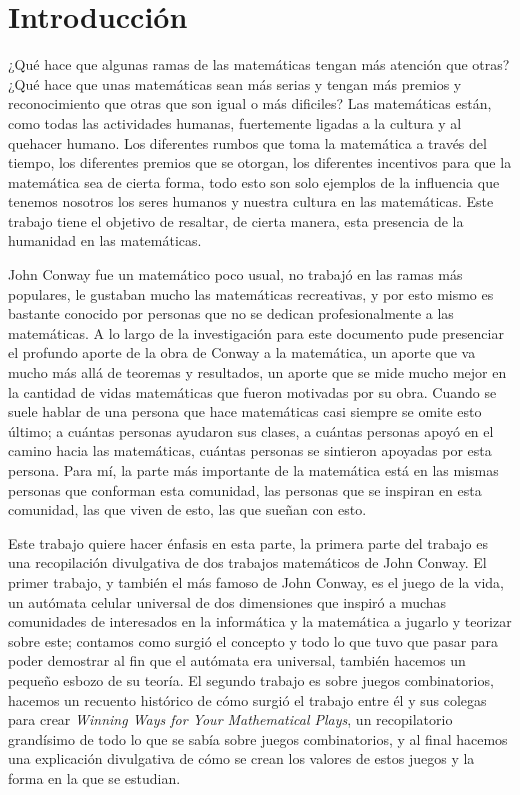 \chapter{Introducci\'{o}n}

¿Qué hace que algunas ramas de las matemáticas tengan más atención que otras? ¿Qué hace que unas matemáticas sean más serias y tengan más premios y reconocimiento que otras que son igual o más dificiles? Las matemáticas están, como todas las actividades humanas, fuertemente ligadas a la cultura y al quehacer humano. Los diferentes rumbos que toma la matemática a través del tiempo, los diferentes premios que se otorgan, los diferentes incentivos para que la matemática sea de cierta forma, todo esto son solo ejemplos de la influencia que tenemos nosotros los seres humanos y nuestra cultura en las matemáticas. Este trabajo tiene el objetivo de resaltar, de cierta manera, esta presencia de la humanidad en las matemáticas.

John Conway fue un matemático poco usual, no trabajó en las ramas más populares, le gustaban mucho las matemáticas recreativas, y por esto mismo es bastante conocido por personas que no se dedican profesionalmente a las matemáticas. A lo largo de la investigación para este documento pude presenciar el profundo aporte de la obra de Conway a la matemática, un aporte que va mucho más allá de teoremas y resultados, un aporte que se mide mucho mejor en la cantidad de vidas matemáticas que fueron motivadas por su obra. Cuando se suele hablar de una persona que hace matemáticas casi siempre se omite esto último; a cuántas personas ayudaron sus clases, a cuántas personas apoyó en el camino hacia las matemáticas, cuántas personas se sintieron apoyadas por esta persona. Para m\'i, la parte más importante de la matemática est\'a en las mismas personas que conforman esta comunidad, las personas que se inspiran en esta comunidad, las que viven de esto, las que sueñan con esto.

Este trabajo quiere hacer énfasis en esta parte, la primera parte del trabajo es una recopilación divulgativa de dos trabajos matemáticos de John Conway. El primer trabajo, y también el más famoso de John Conway, es el juego de la vida, un autómata celular universal de dos dimensiones que inspiró a muchas comunidades de interesados en la informática y la matemática a jugarlo y teorizar sobre este; contamos como surgi\'o el concepto y todo lo que tuvo que pasar para poder demostrar al fin que el aut\'omata era universal, tambi\'en hacemos un peque\~no esbozo de su teor\'ia. El segundo trabajo es sobre juegos combinatorios, hacemos un recuento histórico de cómo surgió el trabajo entre él y sus colegas para crear \textit{Winning Ways for Your Mathematical Plays}, un recopilatorio grand\'isimo de todo lo que se sab\'ia sobre juegos combinatorios, y al final hacemos una explicaci\'on divulgativa de c\'omo se crean los valores de estos juegos y la forma en la que se estudian.

